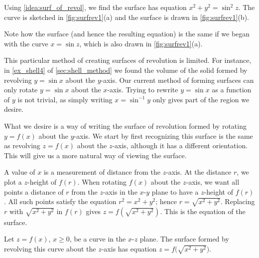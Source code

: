 {%
%
Using \autoref{idea:surf_of_revol}, we find the surface has equation $x^2+y^2=\sin^2z$. The curve is sketched in \autoref{fig:surfrev1}(a) and the surface is drawn in \autoref{fig:surfrev1}(b).

Note how the surface (and hence the resulting equation) is the same if we began with the curve $x=\sin z$, which is also drawn in \autoref{fig:surfrev1}(a).}

This particular method of creating surfaces of revolution is limited. For instance, in \autoref{ex_shell4} of \autoref{sec:shell_method} we found the volume  of the solid formed by revolving $y=\sin x$ about the $y$-axis. Our current method of forming surfaces can only rotate $y=\sin x$ about the $x$-axis. Trying to rewrite $y=\sin x$ as a function of $y$ is not trivial, as simply writing $x=\sin^{-1}y$ only gives part of the region we desire.

What we desire is a way of writing the surface of revolution formed by rotating $y=f(x)$ about the $y$-axis. We start by first recognizing this surface is the same as revolving $z=f(x)$ about the $z$-axis, although it has a different orientation. This will give us a more natural way of viewing the surface. 

A value of $x$ is a measurement of distance from the $z$-axis. At the distance $r$, we plot a $z$-height of $f(r)$. When rotating $f(x)$ about the $z$-axis, we want all points a distance of $r$ from the $z$-axis in the $x$-$y$ plane to have a $z$-height of $f(r)$. All such points satisfy the equation $r^2=x^2+y^2$; hence $r=\sqrt{x^2+y^2}$. Replacing $r$ with $\sqrt{x^2+y^2}$ in $f(r)$ gives $z=f(\sqrt{x^2+y^2})$. This is the equation of the surface.

{Let $z=f(x)$, $x\geq 0$, be a curve in the $x$-$z$ plane. The surface formed by revolving this curve about the $z$-axis has equation $z=f\big(\sqrt{x^2+y^2}\big)$.}

